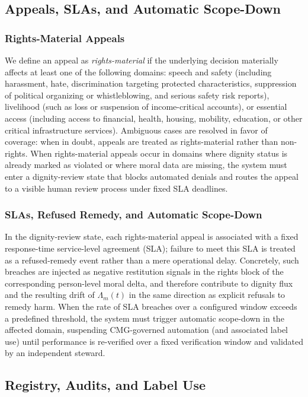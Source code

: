\documentclass[11pt]{article}
\begin{document}
\subsection{Appeals, SLAs, and Automatic Scope-Down}

\subsubsection{Rights-Material Appeals}

We define an appeal as \emph{rights-material} if the underlying decision materially affects at least one of the following domains: speech and safety (including harassment, hate, discrimination targeting protected characteristics, suppression of political organizing or whistleblowing, and serious safety risk reports), livelihood (such as loss or suspension of income-critical accounts), or essential access (including access to financial, health, housing, mobility, education, or other critical infrastructure services). Ambiguous cases are resolved in favor of coverage: when in doubt, appeals are treated as rights-material rather than non-rights. When rights-material appeals occur in domains where dignity status is already marked as violated or where moral data are missing, the system must enter a dignity-review state that blocks automated denials and routes the appeal to a visible human review process under fixed SLA deadlines.
\newpage
\subsubsection{SLAs, Refused Remedy, and Automatic Scope-Down}

In the dignity-review state, each rights-material appeal is associated with a fixed response-time service-level agreement (SLA); failure to meet this SLA is treated as a refused-remedy event rather than a mere operational delay. Concretely, such breaches are injected as negative restitution signals in the rights block of the corresponding person-level moral delta, and therefore contribute to dignity flux and the resulting drift of \(\Lambda_m(t)\) in the same direction as explicit refusals to remedy harm. When the rate of SLA breaches over a configured window exceeds a predefined threshold, the system must trigger automatic scope-down in the affected domain, suspending CMG-governed automation (and associated label use) until performance is re-verified over a fixed verification window and validated by an independent steward.

\subsection{Registry, Audits, and Label Use}
\end{document}
